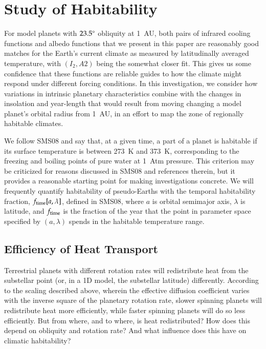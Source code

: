 \section{Study of Habitability}
\label{obl_sec:results}

For model planets with $23.5\mbox{$^\circ$}$ obliquity at 1~AU, both pairs of
infrared cooling functions and albedo functions that we present in
this paper are reasonably good matches for the Earth's current climate
as measured by latitudinally averaged temperature, with $(I_2,A2)$
being the somewhat closer fit.  This gives us some confidence that
these functions are reliable guides to how the climate might respond
under different forcing conditions.  In this investigation, we
consider how variations in intrinsic planetary characteristics combine
with the changes in insolation and year-length that would result from
moving changing a model planet's orbital radius from 1~AU, in an
effort to map the zone of regionally habitable climates.

We follow SMS08 and say that, at a given time, a part of a planet is
habitable if its surface temperature is between 273~K and 373~K,
corresponding to the freezing and boiling points of pure water at
1~Atm pressure.  This criterion may be criticized for reasons
discussed in SMS08 and references therein, but it provides a
reasonable starting point for making investigations concrete.  We will
frequently quantify habitability of pseudo-Earths with the temporal
habitability fraction, $f_{\rm time}[a,\lambda]$, defined in SMS08,
where $a$ is orbital semimajor axis, $\lambda$ is latitude, and
$f_{\rm time}$ is the fraction of the year that the point in parameter
space specified by $(a,\lambda)$ spends in the habitable temperature
range.


\subsection{Efficiency of Heat Transport}
\label{obl_ssec:efficiency}

Terrestrial planets with different rotation rates will redistribute
heat from the substellar point (or, in a 1D model, the substellar
latitude) differently.  According to the scaling described above,
wherein the effective diffusion coefficient varies with the inverse
square of the planetary rotation rate, slower spinning planets will
redistribute heat more efficiently, while faster spinning planets will
do so less efficiently.  But from where, and to where, is heat
redistributed?  How does this depend on obliquity and rotation rate?
And what influence does this have on climatic habitability?

